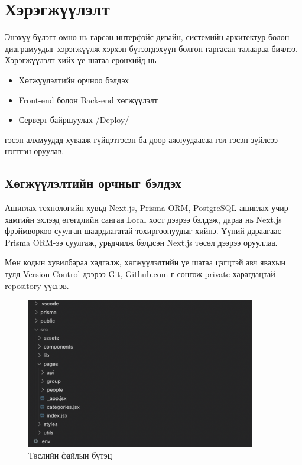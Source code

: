 \chapter{Хэрэгжүүлэлт}

Энэхүү бүлэгт өмнө нь гарсан интерфэйс дизайн, системийн архитектур болон диаграмуудыг хэрэгжүүлж хэрхэн бүтээгдэхүүн болгон гаргасан талаараа бичлээ. Хэрэгжүүлэлт хийх үе шатаа ерөнхийд нь

\begin{itemize}
	\item Хөгжүүлэлтийн орчноо бэлдэх
	\item Front-end болон Back-end хөгжүүлэлт
	\item Серверт байршуулах /Deploy/
\end{itemize}

гэсэн алхмуудад хувааж гүйцэтгэсэн ба доор ажлуудаасаа гол гэсэн зүйлсээ нэгтгэн оруулав.

\section{Хөгжүүлэлтийн орчныг бэлдэх}
\label{section:backend}

Ашиглах технологийн хувьд Next.js, Prisma ORM, PostgreSQL ашиглах учир хамгийн эхлээд өгөгдлийн сангаа Local хост дээрээ бэлдэж, дараа нь Next.js фрэймворкоо суулган шаардлагатай тохиргоонуудыг хийнэ. Үүний дараагаас Prisma ORM-ээ суулгаж, урьдчилж бэлдсэн Next.js төсөл дээрээ орууллаа. 

Мөн кодын хувилбараа хадгалж, хөгжүүлэлтийн үе шатаа цэгцтэй авч явахын тулд  Version Control дээрээ Git, Github.com-г сонгож private харагдацтай repository үүсгэв. 

\clearpage
\begin{figure}[h]
	\centering
	\includegraphics[width=10cm]{images/implement/file-structure.png}
	\caption{Төслийн файлын бүтэц}
	\label{fig:file-structure}
\end{figure}

